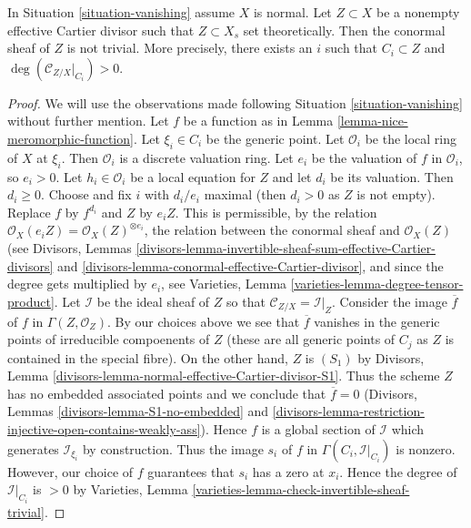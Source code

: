 \begin{lemma}
\label{lemma-nontrivial-normal-bundle}
In Situation \ref{situation-vanishing} assume $X$ is normal.
Let $Z \subset X$ be a nonempty effective Cartier divisor such that
$Z \subset X_s$ set theoretically.
Then the conormal sheaf of $Z$ is not trivial.
More precisely, there exists an $i$ such that $C_i \subset Z$
and $\deg(\mathcal{C}_{Z/X}|_{C_i}) > 0$.
\end{lemma}

\begin{proof}
We will use the observations made following Situation \ref{situation-vanishing}
without further mention. Let $f$ be a function as in
Lemma \ref{lemma-nice-meromorphic-function}.
Let $\xi_i \in C_i$ be the generic point. Let
$\mathcal{O}_i$ be the local ring of $X$ at $\xi_i$. Then $\mathcal{O}_i$
is a discrete valuation ring. Let $e_i$ be the valuation of
$f$ in $\mathcal{O}_i$, so $e_i > 0$. Let $h_i \in \mathcal{O}_i$ be a local
equation for $Z$ and let $d_i$ be its valuation. Then $d_i \geq 0$.
Choose and fix $i$ with $d_i/e_i$ maximal (then $d_i > 0$ as
$Z$ is not empty). Replace $f$ by $f^{d_i}$ and $Z$ by $e_iZ$.
This is permissible, by the relation
$\mathcal{O}_X(e_i Z) = \mathcal{O}_X(Z)^{\otimes e_i}$,
the relation between the conormal sheaf and $\mathcal{O}_X(Z)$
(see Divisors, Lemmas
\ref{divisors-lemma-invertible-sheaf-sum-effective-Cartier-divisors}
and \ref{divisors-lemma-conormal-effective-Cartier-divisor}, and
since the degree gets multiplied by $e_i$, see
Varieties, Lemma \ref{varieties-lemma-degree-tensor-product}.
Let $\mathcal{I}$ be the ideal sheaf of $Z$ so that
$\mathcal{C}_{Z/X} = \mathcal{I}|_Z$. Consider the image $\overline{f}$
of $f$ in $\Gamma(Z, \mathcal{O}_Z)$. By our choices above we see
that $\overline{f}$ vanishes in the generic points of irreducible
compoenents of $Z$ (these are all generic points of $C_j$ as $Z$ is
contained in the special fibre). On the other hand, $Z$ is $(S_1)$ by
Divisors, Lemma \ref{divisors-lemma-normal-effective-Cartier-divisor-S1}.
Thus the scheme $Z$ has no embedded associated points and
we conclude that $\overline{f} = 0$ (Divisors, Lemmas
\ref{divisors-lemma-S1-no-embedded} and
\ref{divisors-lemma-restriction-injective-open-contains-weakly-ass}).
Hence $f$ is a global section of $\mathcal{I}$
which generates $\mathcal{I}_{\xi_i}$ by construction.
Thus the image $s_i$ of $f$ in $\Gamma(C_i, \mathcal{I}|_{C_i})$ is nonzero.
However, our choice of $f$ guarantees that $s_i$ has a zero at $x_i$.
Hence the degree of $\mathcal{I}|_{C_i}$ is $>0$ by
Varieties, Lemma \ref{varieties-lemma-check-invertible-sheaf-trivial}.
\end{proof}

